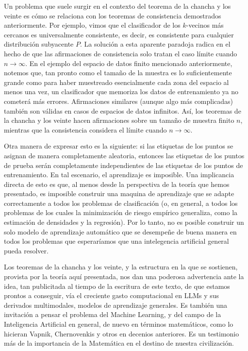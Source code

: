 \documentclass{report}
\begin{document}
Un problema que suele surgir en el contexto del teorema de la chancha y los veinte es cómo se relaciona con los 
teoremas de consistencia demostrados anteriormente. Por ejemplo, vimos que el clasificador 
de los \(k\)-vecinos más cercanos es universalmente consistente, es decir, es consistente para cualquier 
distribución subyacente \(P\). La solución a esta aparente paradoja radica en el hecho de que las afirmaciones de consistencia solo tratan 
el caso límite cuando \(n \to \infty\). En el ejemplo del espacio de datos finito mencionado anteriormente, 
notemos que, tan pronto como el tamaño de la muestra es lo suficientemente grande como para haber muestreado 
esencialmente cada zona del espacio al menos una vez, un clasificador que memoriza los datos de entrenamiento 
ya no cometerá más errores. Afirmaciones similares (aunque algo más complicadas) también son válidas en casos 
de espacios de datos infinitos. Así, los teoremas de la chancha y los veinte hacen afirmaciones sobre un tamaño de muestra finito \(n\), mientras que 
la consistencia considera el límite cuando \(n \to \infty\).\newline

Otra manera de expresar esto es la siguiente: si las etiquetas de los puntos se asignan de manera 
completamente aleatoria, entonces las etiquetas de los puntos de prueba serán completamente independientes 
de las etiquetas de los puntos de entrenamiento. En tal escenario, el aprendizaje es imposible. Una implicancia 
directa de esto es que, al menos desde la perspectiva de la teoría que hemos presentado, es imposible construir
una maquina de aprendizaje que se adapte correctamente a todos los problemas de clasificación (o, en general,
a todos los problemas de los cuales la minimización de riesgo empírico generaliza, como la estimación de densidades
y la regresión). Por lo tanto, no es posible construir un solo modelo de aprendizaje automático que se desempeñe
de buena manera en todos los problemas que esperaríamos que una intelegencia artificial general pueda resolver. \newline

Los
teoremas de la chancha y los veinte, y la estructura en la que se sostienen, provista por la teoría aquí presentada,
nos dan una poderosa advertencia ante la idea, tan publicitada al tiempo de la escritura de este texto, de que estamos
prontos a conseguir, vía el creciente gasto computacional en LLMs y sus derivados multimodales, modelos de aprendizaje
generales. Es también una invitación a pensar el problema del Machine Learning, y del campo de la Inteligencia Artificial
en general, de nuevo en términos matemáticos, como lo hicieran Vapnik, Chernovenkis y otros en decenios anteriores. Es un
testimonio más de la importancia de la Matemática en el destino de nuestra civilización.
 \newline
\end{document}
